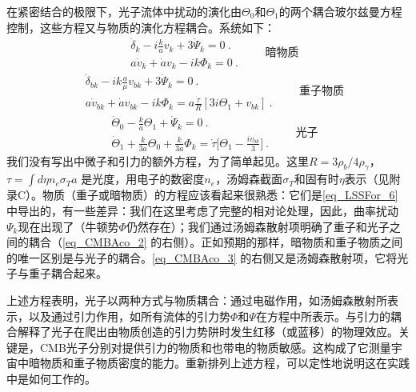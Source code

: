 在紧密结合的极限下，光子流体中扰动的演化由$\Theta_0$和$\Theta_1$的两个耦合玻尔兹曼方程控制，这些方程又与物质的演化方程耦合。系统如下：
\begin{equation}
\begin{aligned}
& \dot{\delta}_k - i \frac{k}{a} v_k + 3 \dot{\Psi}_k = 0~. \\
& a \dot{v}_k + \dot{a} v_k - ik \Phi_k = 0~. 
\end{aligned} \quad \quad \text{暗物质}
\end{equation} 
\begin{equation}\label{eq_CMBAco_2}
\begin{aligned} 
&\dot{\delta}_{bk} - ik \frac{a}{\mu} v_{bk} + 3 \dot{\Psi}_k = 0~. \\
& a \dot{v}_{bk} + \dot{a} v_{bk} - ik \Phi_k = a  \frac{\dot{\tau}}{R}[3 i \Theta_1 + v_{bk}]~.
\end{aligned} \quad \quad \text{重子物质}
\end{equation}
\begin{equation}\label{eq_CMBAco_3}
\begin{aligned} 
&\dot{\Theta}_0 -  \frac{k}{a} \Theta_1 + \dot{\Psi}_k = 0~. \\
& \dot{\Theta}_1 +  \frac{k}{3 a} \Theta_0 +  \frac{k}{3 a} \Phi_k = \dot{\tau} \bigg[\Theta_1 -\frac{ i v_{bk}}{3}\bigg]~. 
\end{aligned} \quad \quad \text{光子}
\end{equation} 
我们没有写出中微子和引力的额外方程，为了简单起见。这里$R = 3\rho_b/4\rho_\gamma$，$\tau = \int d\eta n_e \sigma_T a$ 是光度，用电子的数密度$n_e$，汤姆森截面$\sigma_T$和固有时$\eta$表示（见附录C）。物质（重子或暗物质）的方程应该看起来很熟悉：它们是\autoref{eq_LSSFor_6} 中导出的，有一些差异：我们在这里考虑了完整的相对论处理，因此，曲率扰动$\Psi_k$现在出现了（牛顿势$\Phi$仍然存在）；我们通过汤姆森散射项明确了重子和光子之间的耦合（\autoref{eq_CMBAco_2} 的右侧）。正如预期的那样，暗物质和重子物质之间的唯一区别是与光子的耦合。\autoref{eq_CMBAco_3} 的右侧又是汤姆森散射项，它将光子与重子耦合起来。

上述方程表明，光子以两种方式与物质耦合：通过电磁作用，如汤姆森散射所表示，以及通过引力作用，如所有流体的引力势$\Phi$和$\Psi$在方程中所表示。与引力的耦合解释了光子在爬出由物质创造的引力势阱时发生红移（或蓝移）的物理效应。关键是，CMB光子分别对提供引力的物质和也带电的物质敏感。这构成了它测量宇宙中暗物质和重子物质密度的能力。重新排列上述方程，可以定性地说明这在实践中是如何工作的。

